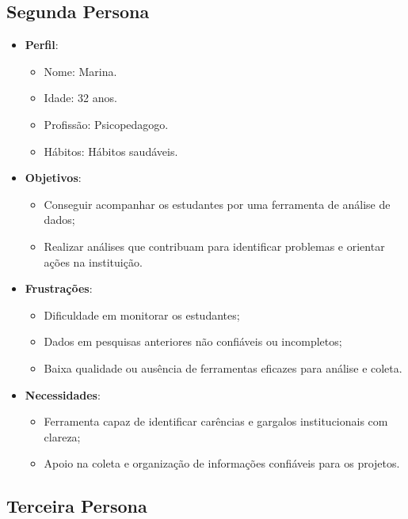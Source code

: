 \subsection{Segunda Persona}

\begin{itemize}
    \item \textbf{Perfil}:
    \begin{itemize}
        \item Nome: Marina.
        \item Idade: 32 anos.
        \item Profissão: Psicopedagogo.
        \item Hábitos: Hábitos saudáveis.
    \end{itemize}

    \item \textbf{Objetivos}:
    \begin{itemize}
        \item Conseguir acompanhar os estudantes por uma ferramenta de análise de dados;
        \item Realizar análises que contribuam para identificar problemas e orientar ações na instituição.
    \end{itemize}

    \item \textbf{Frustrações}:
    \begin{itemize}
        \item Dificuldade em monitorar os estudantes;
        \item Dados em pesquisas anteriores não confiáveis ou incompletos;
        \item Baixa qualidade ou ausência de ferramentas eficazes para análise e coleta.
    \end{itemize}

    \item \textbf{Necessidades}:
    \begin{itemize}
        \item Ferramenta capaz de identificar carências e gargalos institucionais com clareza;
        \item Apoio na coleta e organização de informações confiáveis para os projetos.
    \end{itemize}
\end{itemize}

\subsection{Terceira Persona}

